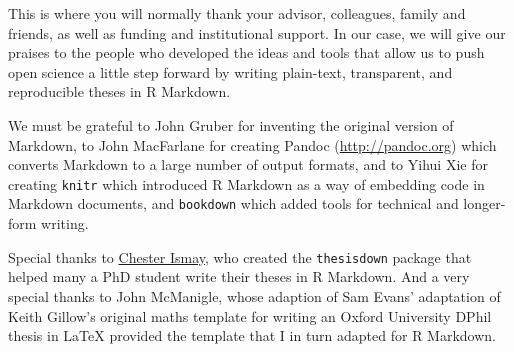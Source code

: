 \documentclass[a4paper, nobind]{templates/ociamthesis}
\begin{document}

\begin{romanpages}

\maketitle


\renewcommand{\numberstyleacks}{plain}
\renewcommand{\numberstyleabstract}{plain}


\begin{acknowledgements}
 	This is where you will normally thank your advisor, colleagues, family and friends, as well as funding and institutional support. In our case, we will give our praises to the people who developed the ideas and tools that allow us to push open science a little step forward by writing plain-text, transparent, and reproducible theses in R Markdown.

  We must be grateful to John Gruber for inventing the original version of Markdown, to John MacFarlane for creating Pandoc (\url{http://pandoc.org}) which converts Markdown to a large number of output formats, and to Yihui Xie for creating \texttt{knitr} which introduced R Markdown as a way of embedding code in Markdown documents, and \texttt{bookdown} which added tools for technical and longer-form writing.

  Special thanks to \href{http://chester.rbind.io}{Chester Ismay}, who created the \texttt{thesisdown} package that helped many a PhD student write their theses in R Markdown. And a very special thanks to John McManigle, whose adaption of Sam Evans' adaptation of Keith Gillow's original maths template for writing an Oxford University DPhil thesis in LaTeX provided the template that I in turn adapted for R Markdown.


\end{acknowledgements}
\end{romanpages}
\end{document}
